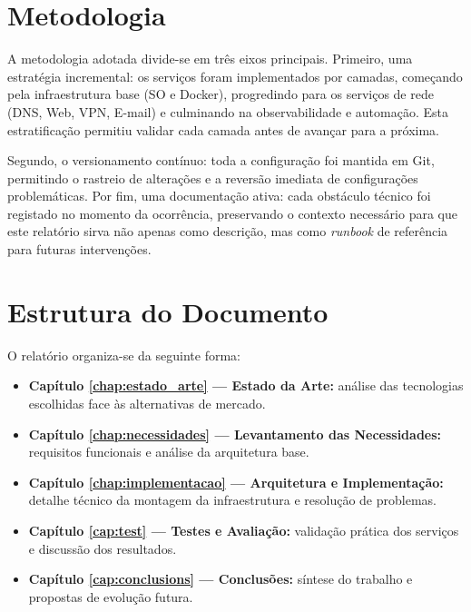 \section{Metodologia}

A metodologia adotada divide-se em três eixos principais. Primeiro, uma estratégia incremental: os serviços foram implementados por camadas, começando pela infraestrutura base (SO e Docker), progredindo para os serviços de rede (DNS, Web, VPN, E-mail) e culminando na observabilidade e automação. Esta estratificação permitiu validar cada camada antes de avançar para a próxima.

Segundo, o versionamento contínuo: toda a configuração foi mantida em Git, permitindo o rastreio de alterações e a reversão imediata de configurações problemáticas. Por fim, uma documentação ativa: cada obstáculo técnico foi registado no momento da ocorrência, preservando o contexto necessário para que este relatório sirva não apenas como descrição, mas como \textit{runbook} de referência para futuras intervenções.

\section{Estrutura do Documento}

O relatório organiza-se da seguinte forma:

\begin{itemize}
    \item \textbf{Capítulo \ref{chap:estado_arte} --- Estado da Arte:} análise das tecnologias escolhidas face às alternativas de mercado.
    \item \textbf{Capítulo \ref{chap:necessidades} --- Levantamento das Necessidades:} requisitos funcionais e análise da arquitetura base.
    \item \textbf{Capítulo \ref{chap:implementacao} --- Arquitetura e Implementação:} detalhe técnico da montagem da infraestrutura e resolução de problemas.
    \item \textbf{Capítulo \ref{cap:test} --- Testes e Avaliação:} validação prática dos serviços e discussão dos resultados.
    \item \textbf{Capítulo \ref{cap:conclusions} --- Conclusões:} síntese do trabalho e propostas de evolução futura.
\end{itemize}